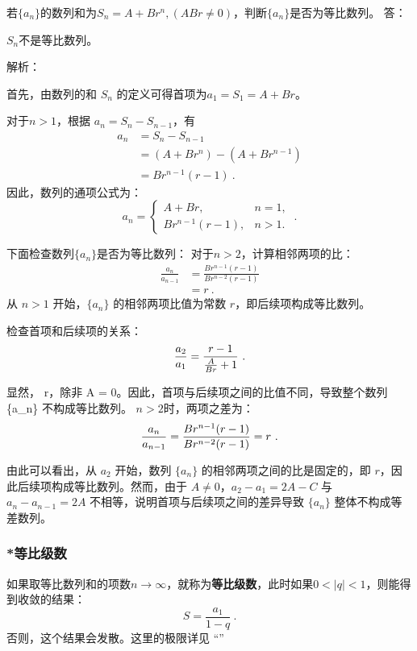 \begin{example}{若$\{a_n\}$的数列和为$S_n=A+Br^n,(ABr\neq0)$，判断$\{a_n\}$是否为等比数列。}
答：

$S_n$不是等比数列。

解析：

首先，由数列的和 $S_n$ 的定义可得首项为$a_1=S_1=A+Br$。

对于$n>1$，根据 $a_n = S_n - S_{n-1}$，有
\begin{equation}
\begin{aligned}
a_n &= S_n - S_{n-1} \\
&= (A + Br^n) - (A + Br^{n-1}) \\
&= Br^{n-1}(r - 1)~.
\end{aligned}
\end{equation}
因此，数列的通项公式为：
\begin{equation}
a_n =
\begin{cases}
A + Br, & n = 1, \\
Br^{n-1}(r - 1), & n > 1.
\end{cases}~.
\end{equation}

下面检查数列$\{a_n\}$是否为等比数列：
对于$ n > 2$，计算相邻两项的比：
\begin{equation}
\begin{aligned}
\frac{a_n}{a_{n-1}} &= \frac{Br^{n-1}(r-1)}{Br^{n-2}(r-1)} \\
&= r~.
\end{aligned}
\end{equation}
从 $n > 1$ 开始，$\{a_n\}$ 的相邻两项比值为常数 $r$，即后续项构成等比数列。

检查首项和后续项的关系：
\begin{equation}
\frac{a_2}{a_1} = \frac{r-1}{{A\over Br} + 1}~.
\end{equation}

显然， \neq r，除非 A = 0。因此，首项与后续项之间的比值不同，导致整个数列 \{a_n\} 不构成等比数列。
$n>2$时，两项之差为：
\begin{equation}
{a_n\over a_{n-1}}= {Br^{n-1}(r-1)\over Br^{n-2}(r-1)}=r~.
\end{equation}

由此可以看出，从 $a_2$ 开始，数列 $\{a_n\}$ 的相邻两项之间的比是固定的，即 $r$，因此后续项构成等比数列。然而，由于 $A \neq 0$，$a_2 - a_1 = 2A - C$ 与 $a_n - a_{n-1} = 2A$ 不相等，说明首项与后续项之间的差异导致 $\{a_n\}$ 整体不构成等差数列。
\end{example}

\subsubsection{*等比级数}

如果取等比数列和的项数$n\rightarrow \infty$，就称为\textbf{等比级数}，此时如果$0<|q|<1$，则能得到收敛的结果：
\begin{equation}
S = \frac{a_1}{1 - q}~.
\end{equation}
否则，这个结果会发散。这里的极限详见 “”